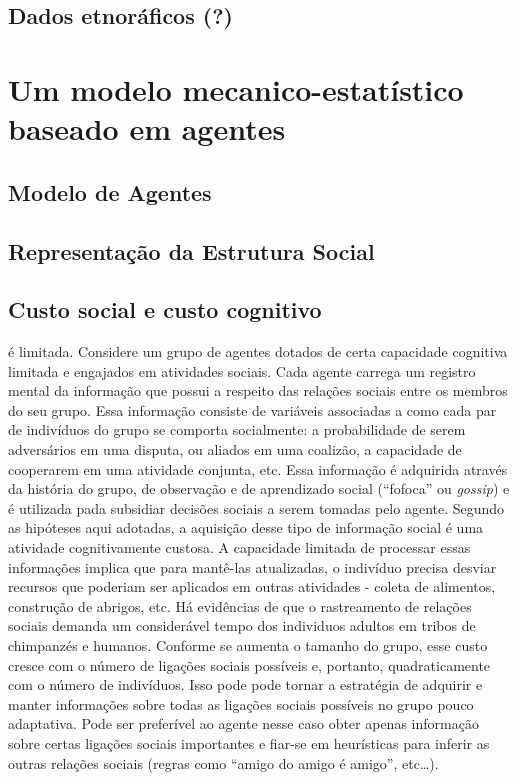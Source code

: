\subsection{Dados etnoráficos (?)}
\section{Um modelo mecanico-estatístico baseado em agentes}
\subsection{Modelo de Agentes}
\subsection{Representação da Estrutura Social}
\subsection{Custo social e custo cognitivo}

 é limitada. Considere um grupo de agentes dotados de certa capacidade cognitiva limitada e engajados em atividades sociais. Cada agente carrega um registro mental da informação que possui a respeito das relações sociais entre os membros do seu grupo. Essa informação consiste de variáveis associadas a como cada par de indivíduos do grupo se comporta socialmente: a probabilidade de serem adversários em uma disputa, ou aliados em uma coalizão, a capacidade de cooperarem em uma atividade conjunta, etc. Essa informação é adquirida através da história do grupo, de observação e de aprendizado social (``fofoca'' ou \textit{gossip}) e é utilizada pada subsidiar decisões sociais a serem tomadas pelo agente. Segundo as hipóteses aqui adotadas, a aquisição desse tipo de informação social é uma atividade cognitivamente custosa. A capacidade limitada de processar essas informações implica que para mantê-las atualizadas, o indivíduo precisa desviar recursos 
que poderiam ser aplicados em outras atividades - coleta de alimentos, construção de abrigos, etc. Há evidências \cite[-5em]{deWaal2007,deWaal1990}de que o rastreamento de relações sociais demanda um considerável tempo dos individuos adultos em tribos de chimpanzés e humanos. Conforme se aumenta o tamanho do grupo, esse custo cresce com o número de ligações sociais possíveis e, portanto, quadraticamente com o número de indivíduos. Isso pode pode tornar a estratégia de adquirir e manter informações sobre todas as ligações sociais possíveis no grupo pouco adaptativa. Pode ser preferível ao agente nesse caso obter apenas informação sobre certas ligações sociais importantes e fiar-se em heurísticas para inferir as outras relações sociais (regras como ``amigo do amigo é amigo'', etc\ldots{}).

